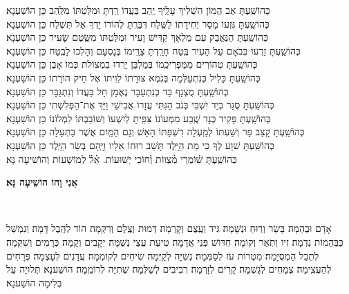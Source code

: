 \documentclass[twoside, openany, parskip=half, 11pt]{book}
\begin{document}
\begin{small}
כְּהוֹשַֽׁעְתָּ אַב הֲמוֹן הִשְׁלִיךְ עָלֶֽיךָ יַֽהַב בַּעֲדוֹ רַֽדְתָּ וּמִלַּטְתּוֹ מִלַּֽהַב \hfill כֵּן הוֹשַׁעְנָא׃\\
כְּהוֹשַֽׁעְתָּ גִּזְעוֹ מָסַר יְחִידָתוֹ לַשֶּֽׁלַח דִּבַּרְֽתָּ לְהוֹרוֹ יָדְךָ אַל תִּשְׁלַח \hfill כֵּן הוֹשַׁעְנָא׃ \\
כְּהוֹשַֽׁעְתָּ הַנֶּאֱבַק עִם מַלְאָךְ קַדִּישׁ וָעִיר וּמִלַּטְתּוֹ מִשֶּֽׂטֶם שָׂעִיר \hfill כֵּן הוֹשַׁעְנָא׃ \\
כְּהוֹשַֽׁעְתָּ זַרְעוֹ בְּבֹאָם עַל הָעִיר בֶּֽטַח חָרַֽדְתָּ צָרֵֽימוֹ בְּנָסְעָם וְהָלְכוּ לָבֶֽטַח \hfill כֵּן הוֹשַׁעְנָא׃ \\
כְּהוֹשַֽׁעְתָּ טְהוֹרִים מִמַּפְרִיכֵֽמוֹ בְּמַלְבֵּן יָרְדוּ בִמְצוֹלֹת כְּמוֹ אָבֶן \hfill כֵּן הוֹשַׁעְנָא׃ \\
כְּהוֹשַֽׁעְתָּ כָּלִיל כְּנִתְעַלְּמָה בְּגֹֽמֶא צוּרָתוֹ לִוִּיתוֹ אֶל חֵיק הוֹרָתוֹ \hfill כֵּן הוֹשַׁעְנָא׃ \\
כְּהוֹשַֽׁעְתָּ מֻצְנָף בַּד כְּנִתְעַבָּר נֶאֶמָן חָל בַּעֲדוֹ וְנִתְגַּבָּר \hfill כֵּן הוֹשַׁעְנָא׃ \\
כְּהוֹשַֽׁעְתָּ סֻגַּר בְּיַד יִשְׁבִּי בְּנֹב הַגִּתִּי עֲזָרוֹ אֲבִישַׁי וַיַּךְ אֶת־הַפְּלִשְׁתִּי \hfill כֵּן הוֹשַׁעְנָא׃\\
כְּהוֹשַֽׁעְתָּ פָּקִיד כְּנָד שֶֽׁבַע מִמְּעוֹנוֹ צִּפִּֽיתָ לְיִשְׁעוֹ וְשׁוֹבַבְתּוֹ לִמְלוֹנוֹ \hfill כֵּן הוֹשַׁעְנָא׃\\
כְּהוֹשַֽׁעְתָּ קָצַב פָּר וְשַׁעְתּוֹ לְמַֽעְלָה רִשְׁפַּתּוֹ הָאֵשׁ וְגַם הַמַּֽיִם אֲשֶׁר בַּתְּעָלָה \hfill כֵּן הוֹשַׁעְנָא׃\\
כְּהוֹשַֽׁעְתָּ שִׁוַע לְךָ כִּי מֵת הַיָּֽלֶד תָּשֵׁב רוּחוֹ אֵלָיו וַיָּֽהָם בְּשַׂר הַיָּֽלֶד \hfill כֵּן הוֹשַׁעְנָא׃\\
כְּהוֹשַֽׁעְתָּ שׁ֗וֹמְרֵי מִ֗צְווֹת וְ֗חוֹכֵי יְשׁוּעוֹת. אֵ֗ל֗ לְמוֹשָׁעוֹת \hfill וְהוֹשִׁיעָה נָּא׃\\

\end{small}




\begin{large}
\textbf{אֲנִי וָהוֹ הוֹשִֽׁיעָה נָּא׃}
\end{large}

\hoshia

\\

\sepline

\label{hoshanarabba}

אָדָם וּבְהֵמָה׃ בָּשָׂר וְרֽוּחַ וּנְשָׁמָה׃ גִּיד וְעֶֽצֶם וְקָרְמָה׃ דְּמוּת וְצֶֽלֶם וְרִקְמָה׃ הוֹד לַהֶֽבֶל דָּמָה׃ וְנִמְשַׁל כַּבְּהֵמוֹת נִדְמָה׃ זִיו וְתֹֽאַר וְקוֹמָה׃ חִדּוּשׁ פְּנֵי אֲדָמָה׃ טִיעַת עֲצֵי נְשַׁמָּה׃ יְקָבִים וְקָמָה׃ כְּרָמִים וְשִׁקְמָה׃ לְתֵבֵל הַמְסֻיָּמָה׃ מִטְרוֹת עֹז לְסַמְּמָה׃ נְשִׁיָּה לְקַיְּמָה׃ שִׂיחִים לְקוֹמְמָה׃ עֲדָנִים לְעָצְמָה׃ פְּרָחִים לְהַעֲצִֽימָה׃ צְמָחִים לְגָשְׁמָה׃ קָרִים לְזָרְמָה׃ רְבִיבִים לְשַׁלְּמָה׃
שְׁתִיָּה לְרוֹמֵֽמָה׃ הוֹשַׁענָא׃
תְּלוּיָה עַל בְּלִימָה הוֹשַׁענָא׃
\end{document}

